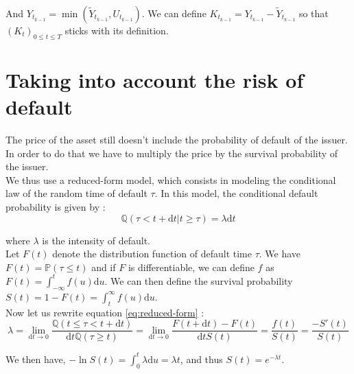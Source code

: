 \documentclass[a4paper,11pt,english]{book}
\begin{document}
And $Y_{t_{k-1}}=\min(\widetilde{Y}_{t_{k-1}},U_{t_{k-1}})$. We can define $K_{t_{k-1}}=Y_{t_{k-1}}-\widetilde{Y}_{t_{k-1}}$ so that $(K_{t})_{0\leq t\leq T}$ sticks with its definition.

\section{Taking into account the risk of default}
The price of the asset still doesn't include the probability of default of the issuer. In order to do that we have to multiply the price by the survival probability of the issuer.\\

We thus use a reduced-form model, which consists in modeling the conditional law of the random time of default $\tau$. In this model, the conditional default probability is given by :
\begin{equation}
    \mathbb{Q}(\tau<t+\text{d}t|t\geq \tau)=\lambda \text{d}t
    \label{eq:reduced-form}
\end{equation}


where $\lambda$ is the intensity of default.\\

Let $F(t)$ denote the distribution function of default time $\tau$. We have $F(t)=\mathbb{P}(\tau\leq t)$ and if $F$ is differentiable, we can define $f$ as $F(t)=\int_{-\infty}^{t}f(u)\text{d}u$.
We can then define the survival probability $S(t) = 1-F(t) = \int_{t}^{\infty}f(u)\text{d}u$.\\

Now let us rewrite equation \ref{eq:reduced-form} :
$$\lambda = \underset{\text{d}t\to 0}{\lim} \frac{\mathbb{Q}(t\leq \tau<t+\text{d}t)}{\text{d}t\mathbb{Q}(\tau\geq t)} = \underset{\text{d}t\to 0}{\lim} \frac{F(t+\text{d}t)-F(t)}{\text{d}t S(t)}=\frac{f(t)}{S(t)}=\frac{-S'(t)}{S(t)}$$

We then have, $-\ln{S(t)}=\int_{0}^{t}\lambda \text{d}u = \lambda t$, and thus $S(t)=e^{-\lambda t}$.
\end{document}
